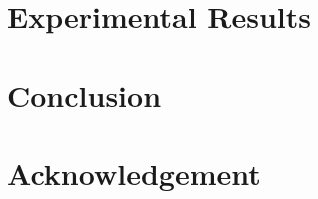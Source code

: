 \documentclass[review,3p,10pt,sort&compress]{elsarticle}
\begin{document}
\section{Experimental Results}\label{sec:4}

\section{Conclusion}\label{sec:5}

\section*{Acknowledgement}





\end{document}
